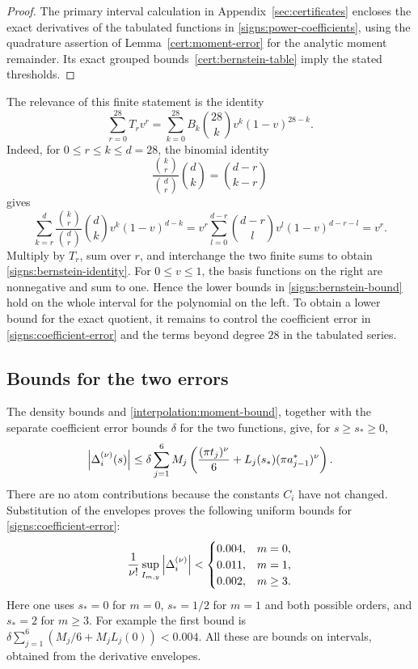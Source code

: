 \begin{proof}
The primary interval calculation in Appendix~\ref{sec:certificates} encloses
the exact derivatives of the tabulated functions in
\eqref{signs:power-coefficients}, using the quadrature assertion of
Lemma~\ref{cert:moment-error} for the analytic moment remainder.
Its exact grouped bounds~\eqref{cert:bernstein-table} imply the stated
thresholds.
\end{proof}

The relevance of this finite statement is the identity
\begin{equation}\label{signs:bernstein-identity}
  \sum_{r=0}^{28}T_r v^r
  =\sum_{k=0}^{28} B_k\binom{28}{k}v^k(1-v)^{28-k}.
\end{equation}
Indeed, for $0\le r\le k\le d=28$, the binomial identity
\[
 \frac{\binom{k}{r}}{\binom{d}{r}}\binom{d}{k}
 =\binom{d-r}{k-r}
\]
gives
\[
 \sum_{k=r}^{d}\frac{\binom{k}{r}}{\binom{d}{r}}
       \binom{d}{k}v^k(1-v)^{d-k}
 =v^r\sum_{l=0}^{d-r}\binom{d-r}{l}v^l(1-v)^{d-r-l}=v^r.
\]
Multiply by $T_r$, sum over $r$, and interchange the two finite sums to
obtain \eqref{signs:bernstein-identity}.
For $0\le v\le1$, the basis functions on the right are nonnegative and
sum to one.  Hence the lower bounds in
\eqref{signs:bernstein-bound} hold on the whole interval for the polynomial
on the left.  To obtain a lower bound for the exact quotient, it remains
to control the coefficient error in \eqref{signs:coefficient-error} and the
terms beyond degree $28$ in the tabulated series.

\subsection{Bounds for the two errors}

The density bounds and \eqref{interpolation:moment-bound}, together with
the separate coefficient error bounds $\delta$ for the two functions,
give, for $s\ge s_*\ge0$,
\begin{equation}\label{signs:perturbation-envelope}
 \left\lvert\Delta_i^{(\nu)}(s)\right\rvert
 \le \delta\sum_{j=1}^6 M_j
       \left(\frac{(\pi t_j)^\nu}{6}
            +L_j(s_*)(\pi a_{j-1}^*)^\nu\right).
\end{equation}
There are no atom contributions because the constants $C_i$ have not
changed.  Substitution of the envelopes proves the following uniform
bounds for \eqref{signs:coefficient-error}:
\begin{equation}\label{signs:perturbation-caps}
 \frac{1}{\nu!}\sup_{I_{m,y}}\left\lvert\Delta_i^{(\nu)}\right\rvert
 <\begin{cases}
    0.004,&m=0,\\
    0.011,&m=1,\\
    0.002,&m\ge3.
   \end{cases}
\end{equation}
Here one uses $s_*=0$ for $m=0$, $s_*=1/2$ for $m=1$ and both possible
orders, and $s_*=2$ for $m\ge3$.  For example the first bound is
$\delta\sum_{j=1}^6(M_j/6+M_jL_j(0))<0.004$.
All these are bounds on intervals, obtained from the derivative envelopes.


